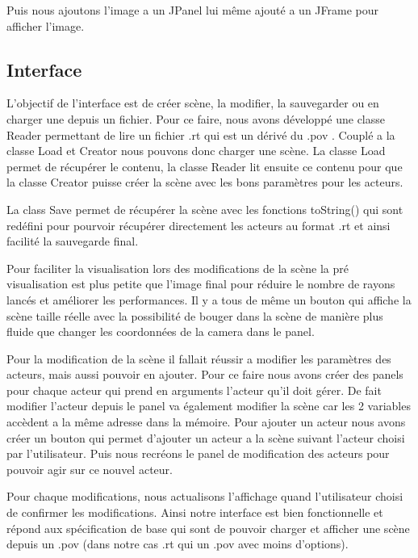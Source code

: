\documentclass[12pt]{article}
\begin{document}
			Puis nous ajoutons l'image a un JPanel lui même ajouté a un JFrame pour afficher l'image.	
		\newpage
		
		\subsection{Interface}
		
		L'objectif de l'interface est de créer scène, la modifier, la sauvegarder ou en charger une depuis un fichier. Pour ce faire, nous avons développé une classe Reader permettant de lire un fichier .rt qui est un dérivé du .pov . Couplé a la classe Load et Creator nous pouvons donc charger une scène. La classe Load permet de récupérer le contenu, la classe Reader lit ensuite ce contenu pour que la classe Creator puisse créer la scène avec les bons paramètres pour les acteurs.
		
		La class Save permet de récupérer la scène avec les fonctions toString() qui sont redéfini pour pourvoir récupérer directement les acteurs au format .rt et ainsi facilité la sauvegarde final.
		
		Pour faciliter la visualisation lors des modifications de la scène la pré visualisation est plus petite que l'image final pour réduire le nombre de rayons lancés et améliorer les performances. Il y a tous de même un bouton qui affiche la scène taille réelle avec la possibilité de bouger dans la scène de manière plus fluide que changer les coordonnées de la camera dans le panel.
		
		Pour la modification de la scène il fallait réussir a modifier les paramètres des acteurs, mais aussi pouvoir en ajouter. Pour ce faire nous avons créer des panels pour chaque acteur qui prend en arguments l'acteur qu'il doit gérer. De fait modifier l'acteur depuis le panel va également modifier la scène car les 2 variables accèdent a la même adresse dans la mémoire. Pour ajouter un acteur nous avons créer un bouton qui permet d'ajouter un acteur a la scène suivant l'acteur choisi par l'utilisateur. Puis nous recréons le panel de modification des acteurs pour pouvoir agir sur ce nouvel acteur.
		
		Pour chaque modifications, nous actualisons l'affichage quand l'utilisateur choisi de confirmer les modifications. Ainsi notre interface est bien fonctionnelle et répond aux spécification de base qui sont de pouvoir charger et afficher une scène depuis un .pov (dans notre cas .rt qui un .pov avec moins d'options).
	
	\newpage	
	
\end{document}
